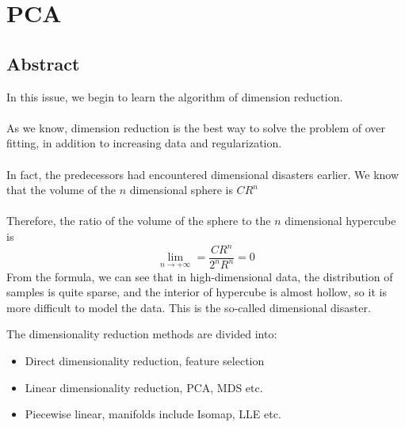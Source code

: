 \documentclass{report}
\begin{document}
\section{PCA}
\subsection{Abstract}
In this issue, we begin to learn the algorithm of dimension reduction.\\\\
As we know, dimension reduction is the best way to solve the problem of over fitting, in addition to increasing data and regularization.\\\\
In fact, the predecessors had encountered dimensional disasters earlier. We know that the volume of the $n $ dimensional sphere is $CR^n$\\\\
Therefore, the ratio of the volume of the sphere to the $n$ dimensional hypercube is
$$
\lim_{n \to +\infty}=\frac{CR^n}{2^n R^n}=0
$$
From the formula, we can see that in high-dimensional data, the distribution of samples is quite sparse, and the interior of hypercube is almost hollow, so it is more difficult to model the data. This is the so-called dimensional disaster.

The dimensionality reduction methods are divided into:
\begin{itemize}
	\item Direct dimensionality reduction, feature selection
	\item Linear dimensionality reduction, PCA, MDS etc.
	\item Piecewise linear, manifolds include Isomap, LLE etc.
\end{itemize}
\end{document}
